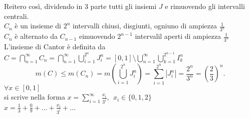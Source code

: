 \documentclass[12px]{article}
\begin{document}
Reitero così, dividendo in 3 parte tutti gli insiemi $J$ e rimuovendo gli intervalli centrali.\\
$C_n$ è un insieme di $2^n$ intervalli chiusi, disgiunti, ogniuno di ampiezza $\frac{1}{3^n}$\\
$C_n$ è alternato da $C_{n-1}$ eimuovendo $2^{n-1}$ intervalil aperti di ampiezza $\frac{1}{3^n}$\\
L'insieme di Cantor è definita da  $C = \bigcap^{\infty}_{n=1}C_n = \bigcap^\infty_{n=1} \bigcup^{2^n}_{i=1}J_i^n = [0,1]\setminus \bigcup^{\infty}_{n=1} \bigcup^{2^{n-1}}_{k=1}I_k^n$\\
\[
m(C)\leq m(C_n) = m( \bigcup^{2^n}_{i=1}J^{n}_i) = \sum^{2^n}_{i=1}|J_i^n| = \frac{2^n}{3^n} = (\frac 23)^n
.\] 
$\forall x\in [0,1]$\\
si scrive nella forma  $x = \sum^{\infty}_{i=1}\frac{x_i}{3^i}, \ \ x_i\in\{0,1,2\}$\\
$x = \frac 13 + \frac 09 + \ldots + \frac {x_i}{3^i} + \ldots$
	
\end{document}
